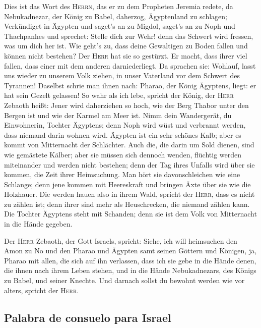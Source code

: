  Dies ist das Wort des \textsc{Herrn}, das er zu dem
Propheten Jeremia redete, da Nebukadnezar, der König zu Babel, daherzog,
Ägyptenland zu schlagen;  Verkündiget in Ägypten und
saget's an zu Migdol, saget's an zu Noph und Thachpanhes und sprechet:
Stelle dich zur Wehr! denn das Schwert wird fressen, was um dich her
ist.  Wie geht's zu, dass deine Gewaltigen zu Boden
fallen und können nicht bestehen? Der \textsc{Herr} hat sie so gestürzt.
 Er macht, dass ihrer viel fallen, dass einer mit dem
anderen darniederliegt. Da sprachen sie: Wohlauf, lasst uns wieder zu
unserem Volk ziehen, in unser Vaterland vor dem Schwert des Tyrannen!
 Daselbst schrie man ihnen nach: Pharao, der König
Ägyptens, liegt: er hat sein Gezelt gelassen!  So wahr
als ich lebe, spricht der König, der \textsc{Herr} Zebaoth heißt: Jener
wird daherziehen so hoch, wie der Berg Thabor unter den Bergen ist und
wie der Karmel am Meer ist.  Nimm dein Wandergerät, du
Einwohnerin, Tochter Ägyptens; denn Noph wird wüst und verbrannt werden,
dass niemand darin wohnen wird.  Ägypten ist ein sehr
schönes Kalb; aber es kommt von Mitternacht der Schlächter.
 Auch die, die darin um Sold dienen, sind wie gemästete
Kälber; aber sie müssen sich dennoch wenden, flüchtig werden miteinander
und werden nicht bestehen; denn der Tag ihres Unfalls wird über sie
kommen, die Zeit ihrer Heimsuchung.  Man hört sie
davonschleichen wie eine Schlange; denn jene kommen mit Heereskraft und
bringen Äxte über sie wie die Holzhauer.  Die werden
hauen also in ihrem Wald, spricht der \textsc{Herr}, dass es nicht zu
zählen ist; denn ihrer sind mehr als Heuschrecken, die niemand zählen
kann.  Die Tochter Ägyptens steht mit Schanden; denn sie
ist dem Volk von Mitternacht in die Hände gegeben.

 Der \textsc{Herr} Zebaoth, der Gott Israels, spricht:
Siehe, ich will heimsuchen den Amon zu No und den Pharao und Ägypten
samt seinen Göttern und Königen, ja, Pharao mit allen, die sich auf ihn
verlassen,  dass ich sie gebe in die Hände denen, die
ihnen nach ihrem Leben stehen, und in die Hände Nebukadnezars, des
Königs zu Babel, und seiner Knechte. Und darnach sollst du bewohnt
werden wie vor alters, spricht der \textsc{Herr}.

\hypertarget{palabra-de-consuelo-para-israel}{%
\subsection{Palabra de consuelo para
Israel}\label{palabra-de-consuelo-para-israel}}

